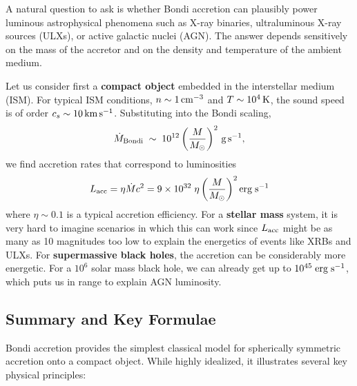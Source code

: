 A natural question to ask is whether Bondi accretion can plausibly power luminous 
astrophysical phenomena such as X-ray binaries, ultraluminous X-ray sources (ULXs), 
or active galactic nuclei (AGN). The answer depends sensitively on the mass of the accretor 
and on the density and temperature of the ambient medium. 
\par
Let us consider first a \textbf{compact object} embedded in the 
interstellar medium (ISM). For typical ISM conditions, 
$n \sim 1\,{\rm cm^{-3}}$ and $T \sim 10^{4}\,{\rm K}$, the sound speed is of order 
$c_s \sim 10\,{\rm km\,s^{-1}}$. Substituting into the Bondi scaling,
\[
\dot{M}_{\rm Bondi} \;\sim\; 10^{12} 
\left(\frac{M}{M_\odot}\right)^2 \, {\rm g\,s^{-1}},
\]
we find accretion rates that correspond to luminosities
\[
L_{\rm acc} = \eta \dot{M} c^2 = 9\times 10^{32}\;\eta \left(\frac{M}{M_\odot}\right)^2 {\rm erg\;s^{-1}}
\]
where $\eta \sim 0.1$ is a typical accretion efficiency. For a \textbf{stellar mass} system, it is very hard to imagine scenarios in which this can work since $L_{\rm acc}$ might be as many as 10 magnitudes too low to explain the energetics of events like XRBs and ULXs. For \textbf{supermassive black holes}, the accretion can be considerably more energetic. For a $10^6$ solar mass black hole, we can already get up to $10^{45}\;{\rm erg \;s^{-1}}$, which puts us in range to explain AGN luminosity. 


\subsection*{Summary and Key Formulae}

Bondi accretion provides the simplest classical model for spherically symmetric accretion onto a compact object. While highly idealized, it illustrates several key physical principles:


